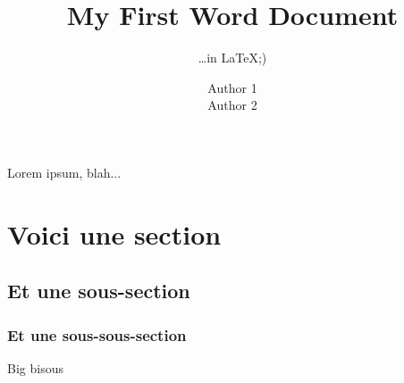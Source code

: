 \documentclass{article}
\title{My First Word Document}
\subtitle{\ldots in \LaTeX ;)}
\author{Author 1\\Author 2}
\begin{document}
\maketitle

Lorem ipsum, blah...

\section{Voici une section}
\subsection{Et une sous-section}
\subsubsection{Et une sous-sous-section}

Big bisous
\end{document}

